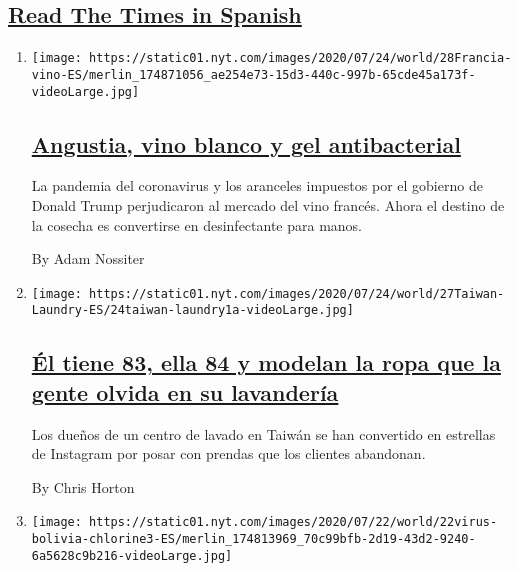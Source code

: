 \hypertarget{read-the-times-in-spanish}{%
\subsection{\texorpdfstring{\protect\hyperlink{}{Read The Times in
Spanish}}{Read The Times in Spanish}}\label{read-the-times-in-spanish}}

\begin{enumerate}
\def\labelenumi{\arabic{enumi}.}
\item
  \texttt{[image: https://static01.nyt.com/images/2020/07/24/world/28Francia-vino-ES/merlin\_174871056\_ae254e73-15d3-440c-997b-65cde45a173f-videoLarge.jpg]}

  \hypertarget{angustia-vino-blanco-y-gel-antibacterial}{%
  \subsection{\texorpdfstring{\href{/es/2020/07/28/espanol/mundo/vino-blanco-alsacia-coronavirus.html}{Angustia,
  vino blanco y gel
  antibacterial}}{Angustia, vino blanco y gel antibacterial}}\label{angustia-vino-blanco-y-gel-antibacterial}}

  La pandemia del coronavirus y los aranceles impuestos por el gobierno
  de Donald Trump perjudicaron al mercado del vino francés. Ahora el
  destino de la cosecha es convertirse en desinfectante para manos.

  By Adam Nossiter
\item
  \texttt{[image: https://static01.nyt.com/images/2020/07/24/world/27Taiwan-Laundry-ES/24taiwan-laundry1a-videoLarge.jpg]}

  \hypertarget{uxe9l-tiene-83-ella-84-y-modelan-la-ropa-que-la-gente-olvida-en-su-lavanderuxeda}{%
  \subsection{\texorpdfstring{\href{/es/2020/07/28/espanol/mundo/lavanderia-taiwanesa-instagram.html}{Él
  tiene 83, ella 84 y modelan la ropa que la gente olvida en su
  lavandería}}{Él tiene 83, ella 84 y modelan la ropa que la gente olvida en su lavandería}}\label{uxe9l-tiene-83-ella-84-y-modelan-la-ropa-que-la-gente-olvida-en-su-lavanderuxeda}}

  Los dueños de un centro de lavado en Taiwán se han convertido en
  estrellas de Instagram por posar con prendas que los clientes
  abandonan.

  By Chris Horton
\item
  \texttt{[image: https://static01.nyt.com/images/2020/07/22/world/22virus-bolivia-chlorine3-ES/merlin\_174813969\_70c99bfb-2d19-43d2-9240-6a5628c9b216-videoLarge.jpg]}


\end{enumerate}
